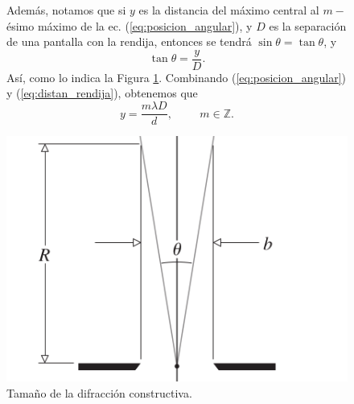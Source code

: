 \documentclass[12pt,a4paper]{article}
\begin{document}
\begin{figure}[hbtp!]
	\begin{minipage}{0.5\linewidth}
		Además, notamos que si 
		\(y\) es la distancia del máximo central al \(m-\)ésimo máximo de la ec. (\ref{eq:posicion_angular}), y \(D\) es la separación de una pantalla con la rendija, entonces se tendrá \(\sin \theta = \tan \theta\), y
		\begin{equation}
			\tan \theta = \dfrac{y}{D}.
			\label{eq:distan_rendija}
		\end{equation}
		Así, como lo indica la Figura \ref{fig:constructiva}. Combinando (\ref{eq:posicion_angular}) y (\ref{eq:distan_rendija}), obtenemos que
		\begin{equation}
			y = \dfrac{m \lambda D}{d} , \hspace{1cm} m \in \mathds{Z} .
			\label{eq:altura}
		\end{equation}
	\end{minipage}\hspace{5mm}
	\begin{minipage}{0.5\linewidth}
		\centering
		\includegraphics[width= 0.8 \linewidth]{1_INTRO/distancia}
		\caption{Tamaño de la difracción constructiva.}
		\label{fig:constructiva}
	\end{minipage}
\end{figure}
\end{document}
